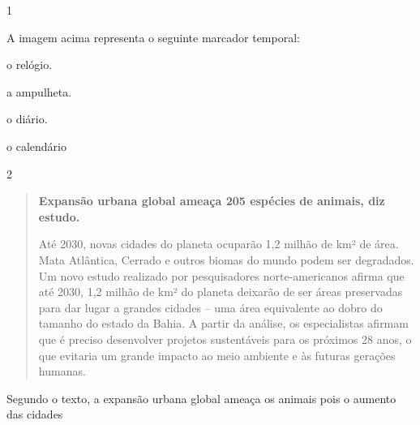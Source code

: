 \num{1}


A imagem acima representa o seguinte marcador temporal:

\begin{escolha}
\item o relógio.

\item a ampulheta.

\item o diário.

\item o calendário
\end{escolha}


\num{2}

\begin{quote}
\textbf{Expansão urbana global ameaça 205 espécies de animais, diz estudo.}

Até 2030, novas cidades do planeta ocuparão 1,2 milhão de km² de área.
Mata Atlântica, Cerrado e outros biomas do mundo podem ser degradados.
Um novo estudo realizado por pesquisadores norte-americanos afirma que
até 2030, 1,2 milhão de km² do planeta deixarão de ser áreas preservadas
para dar lugar a grandes cidades -- uma área equivalente ao dobro do
tamanho do estado da Bahia. A partir da análise, os especialistas
afirmam que é preciso desenvolver projetos sustentáveis para os próximos
28 anos, o que evitaria um grande impacto ao meio ambiente e às futuras
gerações humanas.
\end{quote}

Segundo o texto, a expansão urbana global ameaça os animais pois o
aumento das cidades

